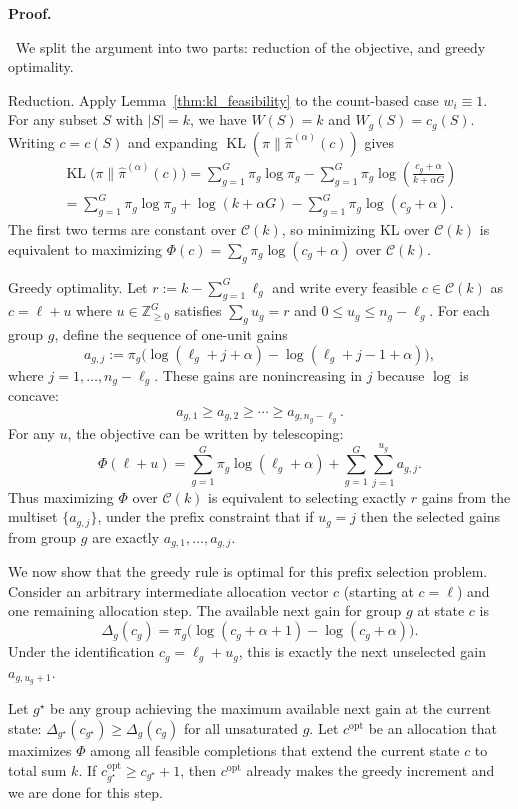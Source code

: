 \documentclass[10pt,journal]{IEEEtran}
\makeatletter
\newcommand{\1}{\mathbf{1}}
\DeclareMathOperator{\KL}{KL}
\theoremstyle{ieeethm}
\renewcommand{\IEEEproofname}{Proof}
\renewenvironment{IEEEproof}[1][\IEEEproofname]{%
  \par\pushQED{\IEEEQED}%
  \normalfont
  \topsep6\p@\@plus6\p@\relax
  \trivlist
  \item[]\textbf{#1.}\ignorespaces
}{%
  \popQED\endtrivlist\@endpefalse
}
\makeatother
\begin{document}
\begin{IEEEproof}
$\;\;$We split the argument into two parts: reduction of the objective, and greedy optimality.

Reduction. Apply Lemma~\ref{thm:kl_feasibility} to the count-based case $w_i\equiv 1$. For any subset $S$ with $|S|=k$,
we have $W(S)=k$ and $W_g(S)=c_g(S)$. Writing $c=c(S)$ and expanding $\KL(\pi\|\hat\pi^{(\alpha)}(c))$ gives
\begin{equation*}
\begin{aligned}
\KL\!\big(\pi\big\|\hat\pi^{(\alpha)}(c)\big)
=
\sum_{g=1}^G \pi_g\log\pi_g
-\sum_{g=1}^G \pi_g\log\!\left(\frac{c_g+\alpha}{k+\alpha G}\right)\\
=
\sum_{g=1}^G \pi_g\log\pi_g + \log(k+\alpha G) - \sum_{g=1}^G \pi_g\log(c_g+\alpha).
\end{aligned}
\end{equation*}
The first two terms are constant over $\mathcal{C}(k)$, so minimizing KL over $\mathcal{C}(k)$ is equivalent to
maximizing $\Phi(c)=\sum_g \pi_g\log(c_g+\alpha)$ over $\mathcal{C}(k)$.

Greedy optimality. Let $r:=k-\sum_{g=1}^G \ell_g$ and write every feasible $c\in\mathcal{C}(k)$ as
$c=\ell+u$ where $u\in\mathbb{Z}_{\ge 0}^G$ satisfies $\sum_g u_g=r$ and $0\le u_g\le n_g-\ell_g$.
For each group $g$, define the sequence of one-unit gains
\[
a_{g,j}:=\pi_g\Big(\log(\ell_g+j+\alpha)-\log(\ell_g+j-1+\alpha)\Big),
\]
where $j=1,\dots,n_g-\ell_g$.
These gains are nonincreasing in $j$ because $\log$ is concave:
\[
a_{g,1}\ge a_{g,2}\ge \cdots \ge a_{g,n_g-\ell_g}.
\]
For any $u$, the objective can be written by telescoping:
\[
\Phi(\ell+u)=\sum_{g=1}^G \pi_g\log(\ell_g+\alpha) + \sum_{g=1}^G \sum_{j=1}^{u_g} a_{g,j}.
\]
Thus maximizing $\Phi$ over $\mathcal{C}(k)$ is equivalent to selecting exactly $r$ gains from the multiset
$\{a_{g,j}\}$, under the prefix constraint that if $u_g=j$ then the selected gains from group $g$ are exactly
$a_{g,1},\dots,a_{g,j}$.

We now show that the greedy rule is optimal for this prefix selection problem. Consider an arbitrary intermediate
allocation vector $c$ (starting at $c=\ell$) and one remaining allocation step.
The available next gain for group $g$ at state $c$ is
\[
\Delta_g(c_g)=\pi_g\Big(\log(c_g+\alpha+1)-\log(c_g+\alpha)\Big).
\]
Under the identification $c_g=\ell_g+u_g$, this is exactly the next unselected gain $a_{g,u_g+1}$.

Let $g^\star$ be any group achieving the maximum available next gain at the current state:
$\Delta_{g^\star}(c_{g^\star})\ge \Delta_g(c_g)$ for all unsaturated $g$.
Let $c^{\mathrm{opt}}$ be an allocation that maximizes $\Phi$ among all feasible completions that extend the current
state $c$ to total sum $k$. If $c^{\mathrm{opt}}_{g^\star}\ge c_{g^\star}+1$, then $c^{\mathrm{opt}}$ already makes
the greedy increment and we are done for this step.


\end{IEEEproof}
\end{document}
